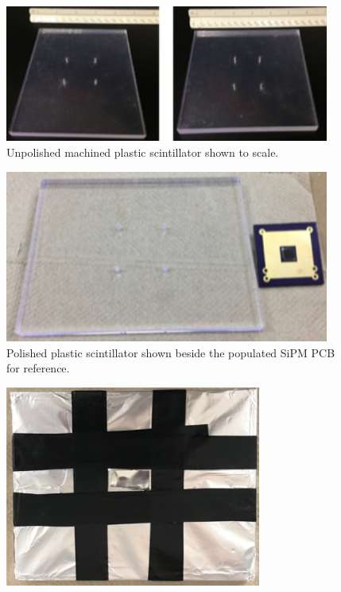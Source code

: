 \begin{itemize}
\begin{figure}[htb]
\centering
\includegraphics[width=0.95\textwidth]{images/Scintillator.png} 
\caption{Unpolished machined plastic scintillator shown to scale.}
\label{MIT_UScintillator}
\end{figure}
\begin{figure}[htb]
\centering
\includegraphics[width=0.95\textwidth]{images/ScintoScale.png} 
\caption{Polished plastic scintillator shown beside the populated SiPM PCB for reference.}
\label{MIT_PScintillator}
\end{figure}
\begin{figure}[htb]
\centering
\includegraphics[width=0.75\textwidth]{images/ScintillatorWrapped.png} 

\end{figure}
\end{itemize}
